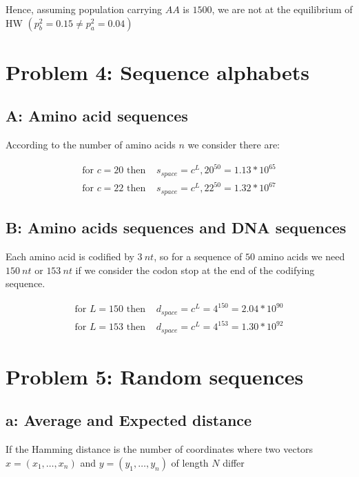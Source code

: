 Hence, assuming population carrying $AA$ is $1500$, we are not at the equilibrium of HW $(p^{2}_b = 0.15 \neq p^{2}_a = 0.04)$

\setcounter{chapter}{4}
\setcounter{section}{0}
\section{Problem 4: Sequence alphabets}

\subsection{A: Amino acid sequences}

According to the number of amino acids $n$ we consider there are:

\begin{align}
\text{for } c = 20 \text{ then } &s_{space} = c^L, 20^{50} = 1.13*10^{65}\\
\text{for } c = 22 \text{ then } &s_{space} = c^L, 22^{50} = 1.32*10^{67}
\end{align}

\subsection{B: Amino acids sequences and DNA sequences}

Each amino acid is codified by $3~nt$, so for a sequence of $50$ amino acids we need $150~nt$ or $153~nt$ if we consider the codon stop at the end of the codifying sequence.

\begin{align}
\text{for } L = 150 \text{ then } &d_{space} = c^L =  4^{150} = 2.04*10^{90}\\
\text{for } L = 153 \text{ then } &d_{space} = c^L =  4^{153} = 1.30*10^{92}
\end{align}

\setcounter{chapter}{5}
\setcounter{section}{0}
\section{Problem 5: Random sequences}

\subsection{a: Average and Expected distance}

If the Hamming distance is the number of coordinates where two vectors $x = (x_1,\dots,x_n) $ and $y = (y_1, \dots, y_n)$ of length $N$ differ

